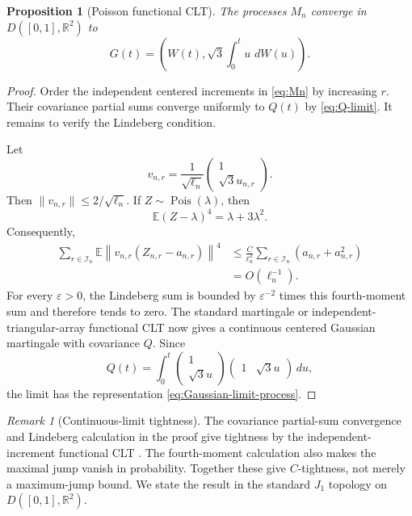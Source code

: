 \documentclass[11pt]{article}
\newtheorem{proposition}[theorem]{Proposition}
\theoremstyle{definition}
\theoremstyle{remark}
\newtheorem{remark}[theorem]{Remark}
\newcommand{\Ee}{\mathbb E}
\newcommand{\dd}{\,d}
\newcommand{\Pois}{\operatorname{Pois}}
\newcommand{\cI}{\mathcal I}
\newcommand{\R}{\mathbb R}
\begin{document}
\begin{proposition}[Poisson functional CLT]
\label{prop:Poisson-FCLT}
The processes $M_n$ converge in $D([0,1],\R^2)$ to
\begin{equation}\label{eq:Gaussian-limit-process}
 G(t)=\left(W(t),\sqrt3\int_0^t u\,\dd W(u)\right).
\end{equation}
\end{proposition}

\begin{proof}
Order the independent centered increments in \eqref{eq:Mn} by increasing
$r$.  Their covariance partial sums converge uniformly to $Q(t)$ by
\eqref{eq:Q-limit}.  It remains to verify the Lindeberg condition.

Let
\[
 v_{n,r}=\frac1{\sqrt{\ell_n}}
 \begin{pmatrix}1\\ \sqrt3u_{n,r}\end{pmatrix}.
\]
Then $\|v_{n,r}\|\le2/\sqrt{\ell_n}$.  If
$Z\sim\Pois(\lambda)$, then
\[
 \Ee(Z-\lambda)^4=\lambda+3\lambda^2.
\]
Consequently,
\begin{align*}
 \sum_{r\in\cI_n}
 \Ee\left\|v_{n,r}(Z_{n,r}-a_{n,r})\right\|^4
 &\le\frac{C}{\ell_n^2}
 \sum_{r\in\cI_n}(a_{n,r}+a_{n,r}^2)\\
 &=O(\ell_n^{-1}).
\end{align*}
For every $\varepsilon>0$, the Lindeberg sum is bounded by
$\varepsilon^{-2}$ times this fourth-moment sum and therefore tends to zero.
The standard martingale or independent-triangular-array functional CLT now
gives a continuous centered Gaussian martingale with covariance $Q$.
Since
\[
 Q(t)=\int_0^t
 \begin{pmatrix}1\\ \sqrt3u\end{pmatrix}
 \begin{pmatrix}1&\sqrt3u\end{pmatrix}\dd u,
\]
the limit has the representation \eqref{eq:Gaussian-limit-process}.
\end{proof}

\begin{remark}[Continuous-limit tightness]
The covariance partial-sum convergence and Lindeberg calculation in the
proof give tightness by the independent-increment functional CLT
\cite{Billingsley1999,EthierKurtz1986}. The fourth-moment calculation also
makes the maximal jump vanish in probability. Together these give
$C$-tightness, not merely a maximum-jump bound. We state the result in the
standard $J_1$ topology on $D([0,1],\R^2)$.
\end{remark}
\end{document}
